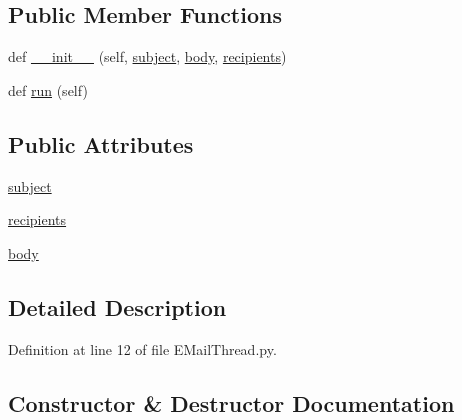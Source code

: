 \subsection*{Public Member Functions}
\begin{DoxyCompactItemize}
\item 
def \hyperlink{class_ground_segment_1_1_utils_1_1_e_mail_thread_1_1_email_thread_a352cb687f49acd51fa5e62d4e4d32e33}{\+\_\+\+\_\+init\+\_\+\+\_\+} (self, \hyperlink{class_ground_segment_1_1_utils_1_1_e_mail_thread_1_1_email_thread_a9776ad6602db5213aadf8eca5dd811dd}{subject}, \hyperlink{class_ground_segment_1_1_utils_1_1_e_mail_thread_1_1_email_thread_a684eab461e7b4c0529e4e886c0d8f36e}{body}, \hyperlink{class_ground_segment_1_1_utils_1_1_e_mail_thread_1_1_email_thread_a238ce0a810aab91c034ed714f01e4267}{recipients})
\item 
def \hyperlink{class_ground_segment_1_1_utils_1_1_e_mail_thread_1_1_email_thread_aae8ce7ccb27a8d92ce06cfa6726a723e}{run} (self)
\end{DoxyCompactItemize}
\subsection*{Public Attributes}
\begin{DoxyCompactItemize}
\item 
\hyperlink{class_ground_segment_1_1_utils_1_1_e_mail_thread_1_1_email_thread_a9776ad6602db5213aadf8eca5dd811dd}{subject}
\item 
\hyperlink{class_ground_segment_1_1_utils_1_1_e_mail_thread_1_1_email_thread_a238ce0a810aab91c034ed714f01e4267}{recipients}
\item 
\hyperlink{class_ground_segment_1_1_utils_1_1_e_mail_thread_1_1_email_thread_a684eab461e7b4c0529e4e886c0d8f36e}{body}
\end{DoxyCompactItemize}


\subsection{Detailed Description}


Definition at line 12 of file E\+Mail\+Thread.\+py.



\subsection{Constructor \& Destructor Documentation}
\hypertarget{class_ground_segment_1_1_utils_1_1_e_mail_thread_1_1_email_thread_a352cb687f49acd51fa5e62d4e4d32e33}{}
